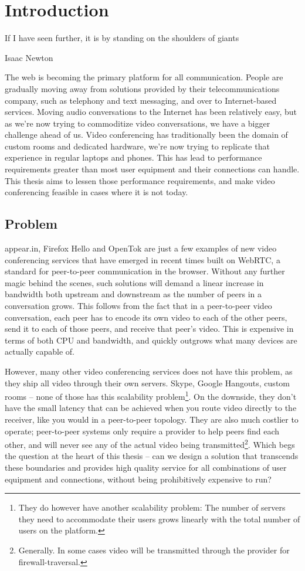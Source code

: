 \chapter{Introduction}\label{chp:introduction}

\epigraph{If I have seen further, it is by standing on the shoulders of giants}{Isaac Newton}

The web is becoming the primary platform for all communication. People are gradually moving away from solutions provided by their telecommunications company, such as telephony and text messaging, and over to Internet-based services. Moving audio conversations to the Internet has been relatively easy, but as we're now trying to commoditize video conversations, we have a bigger challenge ahead of us. Video conferencing has traditionally been the domain of custom rooms and dedicated hardware, we're now trying to replicate that experience in regular laptops and phones. This has lead to performance requirements greater than most user equipment and their connections can handle. This thesis aims to lessen those performance requirements, and make video conferencing feasible in cases where it is not today.


\section{Problem}

appear.in, Firefox Hello and OpenTok are just a few examples of new video conferencing services that have emerged in recent times built on WebRTC, a standard for peer-to-peer communication in the browser. Without any further magic behind the scenes, such solutions will demand a linear increase in bandwidth both upstream and downstream as the number of peers in a conversation grows. This follows from the fact that in a peer-to-peer video conversation, each peer has to encode its own video to each of the other peers, send it to each of those peers, and receive that peer's video. This is expensive in terms of both CPU and bandwidth, and quickly outgrows what many devices are actually capable of.

However, many other video conferencing services does not have this problem, as they ship all video through their own servers. Skype, Google Hangouts, custom rooms -- none of those has this scalability problem\footnote{They do however have another scalability problem: The number of servers they need to accommodate their users grows linearly with the total number of users on the platform.}. On the downside, they don't have the small latency that can be achieved when you route video directly to the receiver, like you would in a peer-to-peer topology. They are also much costlier to operate; peer-to-peer systems only require a provider to help peers find each other, and will never see any of the actual video being transmitted\footnote{Generally. In some cases video will be transmitted through the provider for firewall-traversal.}. Which begs the question at the heart of this thesis -- can we design a solution that transcends these boundaries and provides high quality service for all combinations of user equipment and connections, without being prohibitively expensive to run?

